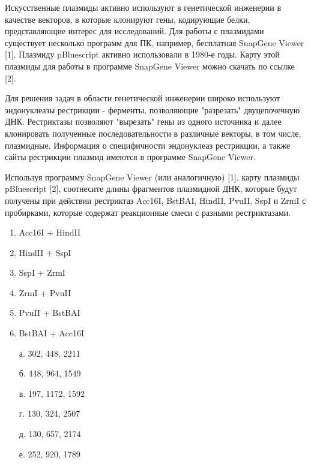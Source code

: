 
Искусственные плазмиды активно используют в генетической инженерии в качестве векторов, в которые клонируют гены, кодирующие белки, представляющие интерес для исследований. Для работы с плазмидами существует несколько программ для ПК, например, бесплатная SnapGene Viewer [1].
Плазмиду pBluescript активно использовали в 1980-е годы. Карту этой плазмиды для работы в программе SnapGene Viewer можно скачать по ссылке [2]. 

Для решения задач в области генетической инженерии широко используют эндонуклеазы рестрикции - ферменты, позволяющие "разрезать" двуцепочечную ДНК. Рестриктазы позволяют "вырезать" гены из одного источника и далее клонировать полученные последовательности в различные векторы, в том числе, плазмидные. Информация о специфичности эндонуклеаз рестрикции, а также сайты рестрикции плазмид имеются в программе SnapGene Viewer.

Используя программу SnapGene Viewer (или аналогичную) [1], карту плазмиды pBluescript [2], соотнесите длины фрагментов плазмидной ﻿ДНК, которые будут получены при действии рестриктаз Acc16I, BstBAI, HindII, PvuII, SspI и ZrmI с ﻿пробирками, которые содержат реакционные смеси с разными рестриктазами.

\begin{multicols}{2}
    {
        \begin{enumerate}
            \item Acc16I + HindII
            \item HindII + SspI
            \item SspI + ZrmI
            \item ZrmI + PvuII
            \item PvuII + BstBAI
            \item BstBAI + Acc16I
        \end{enumerate}
    }

    {
        \begin{enumerate}
            \item[а.] 302, 448, 2211
            \item[б.] 448, 964, 1549
            \item[в.] 197, 1172, 1592
            \item[г.] 130, 324, 2507
            \item[д.] 130, 657, 2174
            \item[е.] 252, 920, 1789            
        \end{enumerate}
    }
    
\end{multicols}

